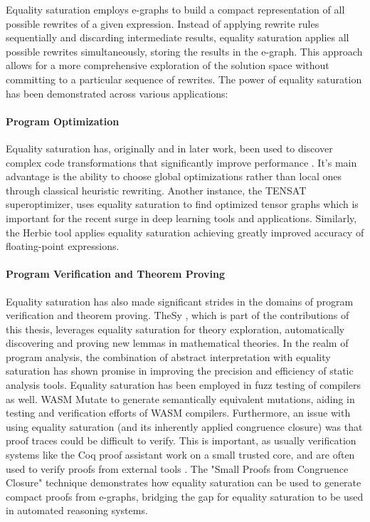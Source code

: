 Equality saturation employs e-graphs to build a compact representation of all possible rewrites of a given expression. 
Instead of applying rewrite rules sequentially and discarding intermediate results, equality saturation applies all possible rewrites simultaneously, storing the results in the e-graph. 
This approach allows for a more comprehensive exploration of the solution space without committing to a particular sequence of rewrites. 
The power of equality saturation has been demonstrated across various applications:

\paragraph{Program Optimization} Equality saturation has, originally and in later work, been used to discover complex code transformations that significantly improve performance \cite{eqsat}.
It's main advantage is the ability to choose global optimizations rather than local ones through classical heuristic rewriting.
Another instance, the TENSAT superoptimizer, uses equality saturation to find optimized tensor graphs \cite{tensat} which is important for the recent surge in deep learning tools and applications.
Similarly, the Herbie tool \cite{herbie} applies equality saturation achieving greatly improved accuracy of floating-point expressions.

\paragraph{Program Verification and Theorem Proving}
Equality saturation has also made significant strides in the domains of program verification and theorem proving. 
TheSy \cite{thesy}, which is part of the contributions of this thesis, leverages equality saturation for theory exploration, automatically discovering and proving new lemmas in mathematical theories.
In the realm of program analysis, the combination of abstract interpretation with equality saturation \cite{abstracteqsat} has shown promise in improving the precision and efficiency of static analysis tools. 
Equality saturation has been employed in fuzz testing of compilers as well. 
WASM Mutate \cite{arteaga2022wasm} to generate semantically equivalent mutations, aiding in testing and verification efforts of WASM compilers. 
Furthermore, an issue with using equality saturation (and its inherently applied congruence closure) was that proof traces could be difficult to verify. 
This is important, as usually verification systems like the Coq proof assistant \cite{Coq:manual} work on a small trusted core, and are often used to verify proofs from external tools \cite{armand2011modular, coqhammer}. 
The "Small Proofs from Congruence Closure" technique \cite{flatt2022small} demonstrates how equality saturation can be used to generate compact proofs from e-graphs, bridging the gap for equality saturation to be used in automated reasoning systems.

